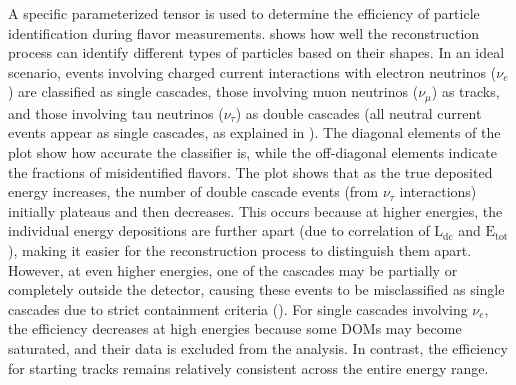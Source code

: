 A specific parameterized tensor is used to determine the efficiency of particle identification during flavor measurements.  shows how well the reconstruction process can identify different types of particles based on their shapes. In an ideal scenario, events involving charged current interactions with electron neutrinos ($\nu_e$) are classified as single cascades, those involving muon neutrinos ($\nu_{\mu}$) as tracks, and those involving tau neutrinos ($\nu_{\tau}$) as double cascades (all neutral current events appear as single cascades, as explained in ). The diagonal elements of the plot show how accurate the classifier is, while the off-diagonal elements indicate the fractions of misidentified flavors. The plot shows that as the true deposited energy increases, the number of double cascade events (from $\nu_{\tau}$ interactions) initially plateaus and then decreases. This occurs because at higher energies, the individual energy depositions are further apart (due to correlation of $\mathrm{L}_{\mathrm{dc}}$ and $\mathrm{E}_{\mathrm{tot}}$), making it easier for the reconstruction process to distinguish them apart. However, at even higher energies, one of the cascades may be partially or completely outside the detector, causing these events to be misclassified as single cascades due to strict containment criteria (). For single cascades involving $\nu_e$, the efficiency decreases at high energies because some DOMs may become saturated, and their data is excluded from the analysis. In contrast, the efficiency for starting tracks remains relatively consistent across the entire energy range.


